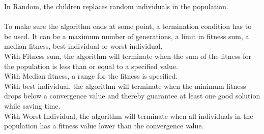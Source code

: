 In Random, the children replaces random individuals in the population.\\
\\
To make sure the algorithm ends at some point, a termination condition has to be used. It can be a maximum number of generations, a limit in fitness sum, a median fitness, best individual or worst individual.\\
With Fitness sum, the algorithm will terminate when the sum of the fitness for the population is less than or equal to a specified value.\\
With Median fitness, a range for the fitness is specified.\\
With best individual, the algorithm will terminate when the minimum fitness drops below a convergence value and thereby guarantee at least one good solution while saving time.\\
With Worst Individual, the algorithm will terminate when all individuals in the population has a fitness value lower than the convergence value.\\

